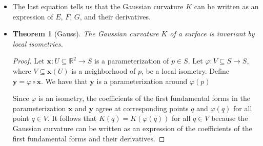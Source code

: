 \documentclass[10pt]{article}
\newtheorem{theorem}[lemma]{Theorem}
\newcommand{\ve}[1]{\mathbf{#1}}
\newcommand{\ra}{\rightarrow}
\newcommand{\Real}{\mathbb{R}}
\newcommand{\sseq}{\subseteq}
\begin{document}
\begin{itemize}
    \item The last equation tells us that the Gaussian curvature $K$ can be written as an expression of $E$, $F$, $G$, and their derivatives.
    
    \item \begin{theorem}[Gauss]
      The Gaussian curvature $K$ of a surface is invariant by local isometries.
    \end{theorem}
    \begin{proof}
      Let $\ve{x} : U \sseq \Real^2 \ra S$ is a parameterization of $p \in S$. Let $\varphi: V \sseq S \ra S$, where $V \sseq \ve{x}(U)$ is a neighborhood of $p$, be a local isometry. Define $\ve{y} = \varphi \circ \ve{x}$. We have that $\ve{y}$ is a parameterization around $\varphi(p)$

      Since $\varphi$ is an isometry, the coefficients of the first fundamental forms in the parameterization $\ve{x}$ and $\ve{y}$ agree at corresponding points $q$ and $\varphi(q)$ for all point $q \in V$. It follows that $K(q) = K(\varphi(q))$ for all $q \in V$ because the Gaussian curvature can be written as an expression of the coefficients of the first fundamental forms and their derivatives.
    \end{proof}
  \end{itemize}
\end{document}
